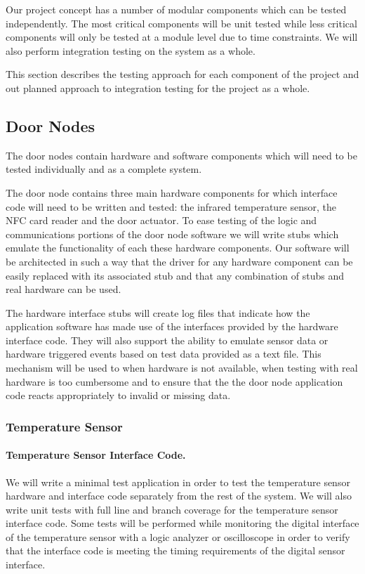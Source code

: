 Our project concept has a number of modular components which can be tested
independently. The most critical components will be unit tested while less
critical components will only be tested at a module level due to time
constraints. We will also perform integration testing on the system as a whole.

This section describes the testing approach for each component of the project
and out planned approach to integration testing for the project as a whole.

\subsection{Door Nodes}

The door nodes contain hardware and software components which will need to be
tested individually and as a complete system.

The door node contains three main hardware components for which interface code
will need to be written and tested: the infrared temperature sensor, the NFC
card reader and the door actuator. To ease testing of the logic and
communications portions of the door node software we will write stubs which
emulate the functionality of each these hardware components. Our software will
be architected in such a way that the driver for any hardware component can be
easily replaced with its associated stub and that any combination of stubs and
real hardware can be used.

The hardware interface stubs will create log files that indicate how the
application software has made use of the interfaces provided by the hardware
interface code. They will also support the ability to emulate sensor data or
hardware triggered events based on test data provided as a text file. This
mechanism will be used to when hardware is not available, when testing with real
hardware is too cumbersome and to ensure that the the door node application code
reacts appropriately to invalid or missing data.

\subsubsection{Temperature Sensor}

\paragraph{Temperature Sensor Interface Code.}
We will write a minimal test application in order to test the temperature sensor
hardware and interface code separately from the rest of the system. We will also
write unit tests with full line and branch coverage for the temperature sensor
interface code. Some tests will be performed while monitoring the digital
interface of the temperature sensor with a logic analyzer or oscilloscope in
order to verify that the interface code is meeting the timing requirements of
the digital sensor interface.

